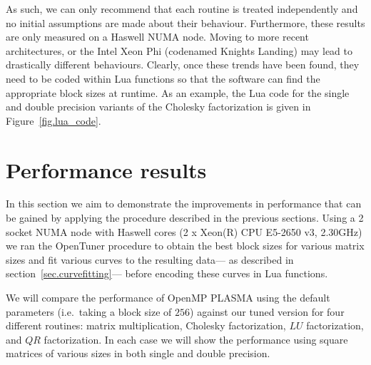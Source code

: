 \documentclass[a4paper,12pt]{article}
\begin{document}
As such,
we can only recommend that each routine is treated
independently and no initial assumptions are
made about their behaviour.
Furthermore,
these results are only measured on a Haswell NUMA node.
Moving to more recent architectures,
or the Intel Xeon Phi (codenamed Knights Landing)
may lead to drastically different behaviours.
Clearly,
once these trends have been found,
they need to be coded within Lua functions so that the
software can find the appropriate block sizes at runtime.
As an example, the Lua code for the single and double
precision variants of the Cholesky factorization is given
in Figure~\ref{fig.lua_code}.

\section{Performance results}
\label{sec.performance}
In this section we aim to demonstrate the
improvements in performance that can be gained
by applying the procedure described in the
previous sections.
Using a 2 socket NUMA node with
Haswell cores (2 x Xeon(R) CPU E5-2650 v3, 2.30GHz)
we ran the OpenTuner procedure to obtain the
best block sizes for various matrix sizes and
fit various curves to the resulting data---%
as described in section~\ref{sec.curvefitting}---%
before encoding these curves in Lua functions.

We will compare the performance of OpenMP PLASMA
using the default parameters (i\@.e\@.~taking a block size of $256$)
against our tuned version for four different routines:
matrix multiplication, Cholesky factorization,
$LU$ factorization, and $QR$ factorization.
In each case we will show the performance using square matrices of
various sizes in both single and double precision.
\end{document}

